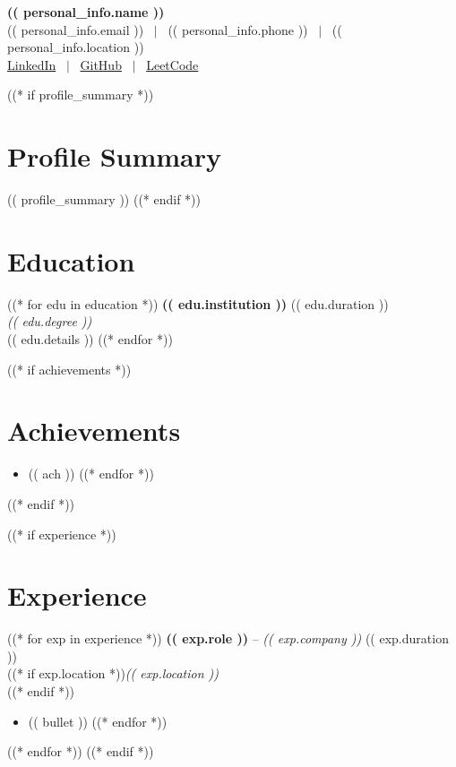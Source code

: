 \documentclass[10pt, a4paper]{article}
\begin{document}
\begin{center}
    {\Huge \textbf{(( personal_info.name ))}} \\ \vspace{3pt}
    (( personal_info.email )) \ $|$ \ (( personal_info.phone )) \ $|$ \ (( personal_info.location )) \\ \vspace{2pt}
    \href{(( personal_info.linkedin ))}{LinkedIn} \ $|$ \ \href{(( personal_info.github ))}{GitHub} \ $|$ \ \href{(( personal_info.leetcode ))}{LeetCode}
\end{center}

((* if profile_summary *))
\section{Profile Summary}
{\small (( profile_summary ))}
((* endif *))

\section{Education}
((* for edu in education *))
\noindent \textbf{(( edu.institution ))} \hfill (( edu.duration )) \\
\textit{(( edu.degree ))} \\
\small{(( edu.details ))}
((* endfor *))

((* if achievements *))
\section{Achievements}
\begin{itemize}
((* for ach in achievements *))
    \item (( ach ))
((* endfor *))
\end{itemize}
((* endif *))

((* if experience *))
\section{Experience}
((* for exp in experience *))
\noindent \textbf{(( exp.role ))} -- \textit{(( exp.company ))} \hfill (( exp.duration )) \\
((* if exp.location *))\textit{\small{(( exp.location ))}} \\((* endif *))
\begin{itemize}
((* for bullet in exp.bullets *))
    \item (( bullet ))
((* endfor *))
\end{itemize}
\vspace{2pt}
((* endfor *))
((* endif *))
\end{document}
